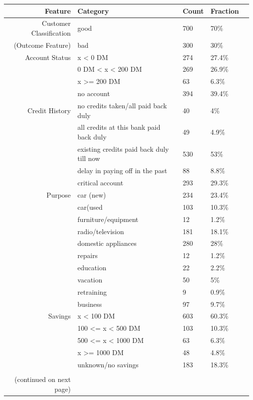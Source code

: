 \documentclass[12pt]{article}
\begin{document}
\begin{table}[!ht]
\centering
\begin{tabular}{rllll}
  \hline
Feature & Category & Count & Fraction \\ 
  \hline
Customer Classification & good & 700 & 70\% \\ 
(Outcome Feature) &bad & 300 & 30\% \\
\hline
Account Status & x < 0 DM & 274 & 27.4\% \\ 
 & 0 DM < x < 200 DM & 269 & 26.9\% \\ 
 & x >= 200 DM & 63 & 6.3\% \\ 
& no account & 394 & 39.4\% \\ 
\hline
Credit History & no credits taken/all paid back duly & 40 & 4\% \\ 
& all credits at this bank paid back duly & 49 & 4.9\% \\ 
 & existing credits paid back duly till now & 530 & 53\% \\ 
 & delay in paying off in the past & 88 & 8.8\% \\ 
 & critical account & 293 & 29.3\% \\ 
\hline
 Purpose & car (new) & 234 & 23.4\% \\ 
 & car(used & 103 & 10.3\% \\ 
&furniture/equipment & 12 & 1.2\% \\ 
&radio/television & 181 & 18.1\% \\ 
& domestic appliances & 280 & 28\% \\ 
 &repairs & 12 & 1.2\% \\ 
 &education & 22 & 2.2\% \\ 
 &vacation & 50 & 5\% \\ 
 &retraining & 9 & 0.9\% \\ 
 &business & 97 & 9.7\% \\ 
\hline
 Savings & x < 100 DM & 603 & 60.3\% \\ 
&100 <= x <  500 DM & 103 & 10.3\% \\ 
&500 <= x < 1000 DM & 63 & 6.3\% \\ 
&x >= 1000 DM & 48 & 4.8\% \\ 
&unknown/no savings & 183 & 18.3\% \\ 
\hline\\
(continued on next page) & & & 
\end{tabular}
\end{table}
\end{document}
